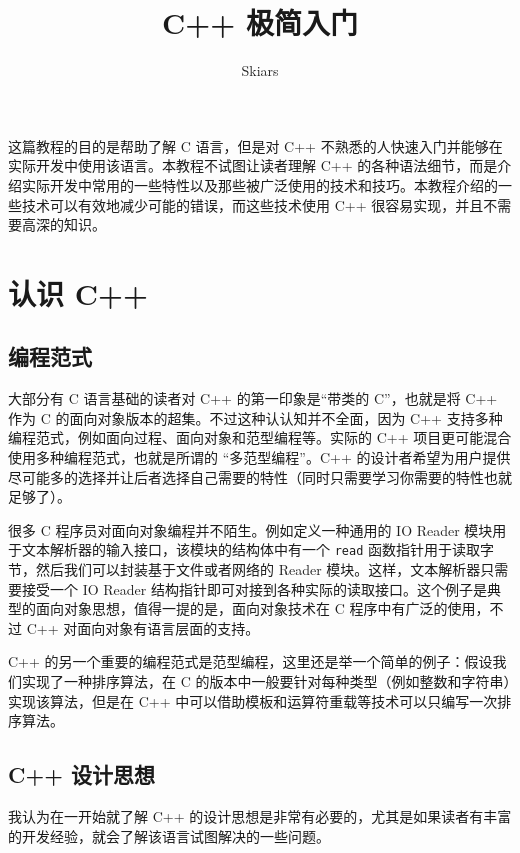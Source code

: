 \documentclass[hyperref,UTF8]{article}
\begin{document}
\title{C++ 极简入门}
\author{Skiars}

{\bfseries\maketitle}

这篇教程的目的是帮助了解 C 语言，但是对 C++ 不熟悉的人快速入门并能够在实际开发中使用该语言。本教程不试图让读者理解 C++ 的各种语法细节，而是介绍实际开发中常用的一些特性以及那些被广泛使用的技术和技巧。本教程介绍的一些技术可以有效地减少可能的错误，而这些技术使用 C++ 很容易实现，并且不需要高深的知识。

\setcounter{tocdepth}{2}
\tableofcontents

\section{认识 C++}

\subsection{编程范式}

大部分有 C 语言基础的读者对 C++ 的第一印象是``带类的 C''，也就是将 C++ 作为 C 的面向对象版本的超集。不过这种认认知并不全面，因为 C++ 支持多种编程范式，例如面向过程、面向对象和范型编程等。实际的 C++ 项目更可能混合使用多种编程范式，也就是所谓的 ``多范型编程''。C++ 的设计者希望为用户提供尽可能多的选择并让后者选择自己需要的特性（同时只需要学习你需要的特性也就足够了）。

很多 C 程序员对面向对象编程并不陌生。例如定义一种通用的 IO Reader 模块用于文本解析器的输入接口，该模块的结构体中有一个 \texttt{read} 函数指针用于读取字节，然后我们可以封装基于文件或者网络的 Reader 模块。这样，文本解析器只需要接受一个 IO Reader 结构指针即可对接到各种实际的读取接口。这个例子是典型的面向对象思想，值得一提的是，面向对象技术在 C 程序中有广泛的使用，不过 C++ 对面向对象有语言层面的支持。

C++ 的另一个重要的编程范式是范型编程，这里还是举一个简单的例子：假设我们实现了一种排序算法，在 C 的版本中一般要针对每种类型（例如整数和字符串）实现该算法，但是在 C++ 中可以借助模板和运算符重载等技术可以只编写一次排序算法。

\subsection{C++ 设计思想}

我认为在一开始就了解 C++ 的设计思想是非常有必要的，尤其是如果读者有丰富的开发经验，就会了解该语言试图解决的一些问题。
\end{document}
